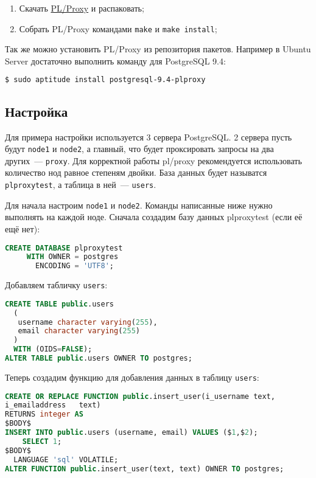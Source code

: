 \begin{enumerate}
  \item Скачать \href{http://pgfoundry.org/projects/plproxy}{PL/Proxy} и распаковать;
  \item Собрать PL/Proxy командами \lstinline!make! и \lstinline!make install!;
\end{enumerate}

Так же можно установить PL/Proxy из репозитория пакетов. Например в Ubuntu Server достаточно выполнить команду для PostgreSQL 9.4:

\begin{lstlisting}[language=Bash,label=lst:plproxy1,caption=Установка]
$ sudo aptitude install postgresql-9.4-plproxy
\end{lstlisting}


\subsection{Настройка}


Для примера настройки используется 3 сервера PostgreSQL. 2 сервера пусть будут \lstinline!node1! и \lstinline!node2!, а главный, что будет проксировать запросы на два других~--- \lstinline!proxy!. Для корректной работы pl/proxy рекомендуется использовать количество нод равное степеням двойки. База данных будет называтся \lstinline!plproxytest!, а таблица в ней~--- \lstinline!users!.

Для начала настроим \lstinline!node1! и \lstinline!node2!. Команды написанные ниже нужно выполнять на каждой ноде. Сначала создадим базу данных plproxytest (если её ещё нет):

\begin{lstlisting}[language=SQL,label=lst:plproxy2,caption=Настройка]
CREATE DATABASE plproxytest
     WITH OWNER = postgres
       ENCODING = 'UTF8';
\end{lstlisting}

Добавляем табличку \lstinline!users!:

\begin{lstlisting}[language=SQL,label=lst:plproxy3,caption=Настройка]
CREATE TABLE public.users
  (
   username character varying(255),
   email character varying(255)
  )
  WITH (OIDS=FALSE);
ALTER TABLE public.users OWNER TO postgres;
\end{lstlisting}

Теперь создадим функцию для добавления данных в таблицу \lstinline!users!:

\begin{lstlisting}[language=SQL,label=lst:plproxy4,caption=Настройка]
CREATE OR REPLACE FUNCTION public.insert_user(i_username text,
i_emailaddress   text)
RETURNS integer AS
$BODY$
INSERT INTO public.users (username, email) VALUES ($1,$2);
    SELECT 1;
$BODY$
  LANGUAGE 'sql' VOLATILE;
ALTER FUNCTION public.insert_user(text, text) OWNER TO postgres;
\end{lstlisting}

